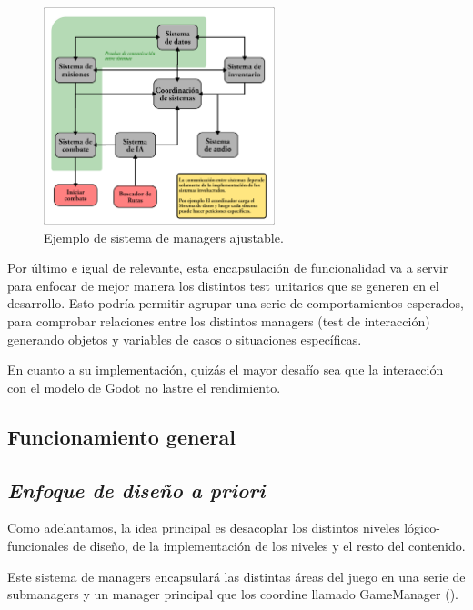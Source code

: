 \begin{figure}[ht]
	\centering
	\includegraphics[width=0.6\textwidth]{img/arquitectura.png}
	\caption{Ejemplo de sistema de managers ajustable.}
\end{figure}

Por último e igual de relevante, esta encapsulación de funcionalidad va a servir para enfocar de mejor manera los distintos test unitarios que se generen en el desarrollo. Esto podría permitir agrupar una serie de comportamientos esperados, para comprobar relaciones entre los distintos managers (test de interacción) generando objetos y variables de casos o situaciones específicas.

En cuanto a su implementación, quizás el mayor desafío sea que la interacción con el modelo de Godot no lastre el rendimiento.

\subsection{Funcionamiento general}\label{modelado:funcionamiento-general}
\subsection*{\noindent\normalfont\textit{Enfoque de diseño a priori}}

Como adelantamos, la idea principal es desacoplar los distintos niveles lógico-funcionales de diseño, de la implementación de los niveles y el resto del contenido.

Este sistema de managers encapsulará las distintas áreas del juego en una serie de submanagers y un manager principal que los coordine llamado GameManager ().

